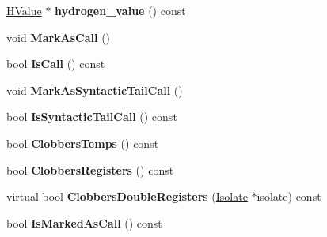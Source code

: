 \begin{DoxyCompactItemize}
\item 
\hyperlink{classv8_1_1internal_1_1_h_value}{H\+Value} $\ast$ {\bfseries hydrogen\+\_\+value} () const \hypertarget{classv8_1_1internal_1_1_l_instruction_af71bb259ebbc0a2487cf692db58d2bfa}{}\label{classv8_1_1internal_1_1_l_instruction_af71bb259ebbc0a2487cf692db58d2bfa}

\item 
void {\bfseries Mark\+As\+Call} ()\hypertarget{classv8_1_1internal_1_1_l_instruction_a9dc545055b25ef6d6210176159e4110a}{}\label{classv8_1_1internal_1_1_l_instruction_a9dc545055b25ef6d6210176159e4110a}

\item 
bool {\bfseries Is\+Call} () const \hypertarget{classv8_1_1internal_1_1_l_instruction_a00e004b64fc7724c83aad55ac9530e0f}{}\label{classv8_1_1internal_1_1_l_instruction_a00e004b64fc7724c83aad55ac9530e0f}

\item 
void {\bfseries Mark\+As\+Syntactic\+Tail\+Call} ()\hypertarget{classv8_1_1internal_1_1_l_instruction_a72c62906028bed230decd2719d08a847}{}\label{classv8_1_1internal_1_1_l_instruction_a72c62906028bed230decd2719d08a847}

\item 
bool {\bfseries Is\+Syntactic\+Tail\+Call} () const \hypertarget{classv8_1_1internal_1_1_l_instruction_a2f5419706e2dbe5ab9cc774e3c2816c0}{}\label{classv8_1_1internal_1_1_l_instruction_a2f5419706e2dbe5ab9cc774e3c2816c0}

\item 
bool {\bfseries Clobbers\+Temps} () const \hypertarget{classv8_1_1internal_1_1_l_instruction_ae0d7f1fe3d3d67357050ddb2cd539d62}{}\label{classv8_1_1internal_1_1_l_instruction_ae0d7f1fe3d3d67357050ddb2cd539d62}

\item 
bool {\bfseries Clobbers\+Registers} () const \hypertarget{classv8_1_1internal_1_1_l_instruction_a1be40eb2a9feb7da6047a05f41e6fb5c}{}\label{classv8_1_1internal_1_1_l_instruction_a1be40eb2a9feb7da6047a05f41e6fb5c}

\item 
virtual bool {\bfseries Clobbers\+Double\+Registers} (\hyperlink{classv8_1_1internal_1_1_isolate}{Isolate} $\ast$isolate) const \hypertarget{classv8_1_1internal_1_1_l_instruction_acbdd958e836acbc67e53ae3de2b17149}{}\label{classv8_1_1internal_1_1_l_instruction_acbdd958e836acbc67e53ae3de2b17149}

\item 
bool {\bfseries Is\+Marked\+As\+Call} () const \hypertarget{classv8_1_1internal_1_1_l_instruction_afb5aff9204835a6dcec75538e3da4b2f}{}\label{classv8_1_1internal_1_1_l_instruction_afb5aff9204835a6dcec75538e3da4b2f}


\end{DoxyCompactItemize}
